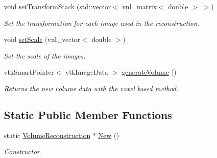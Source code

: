 \begin{DoxyCompactItemize}
void \hyperlink{class_volume_reconstruction_af64a1f92390e10bb4137fb4336b6c642}{set\-Transform\-Stack} (std\-::vector$<$ vnl\-\_\-matrix$<$ double $>$ $>$)
\begin{DoxyCompactList}\small\item\em Set the transformation for each image used in the reconstruction. \end{DoxyCompactList}\item 
void \hyperlink{class_volume_reconstruction_a0d8aadc257be0ebaf0830c2134c6af6e}{set\-Scale} (vnl\-\_\-vector$<$ double $>$)
\begin{DoxyCompactList}\small\item\em Set the scale of the images. \end{DoxyCompactList}\item 
vtk\-Smart\-Pointer$<$ vtk\-Image\-Data $>$ \hyperlink{class_volume_reconstruction_a30444231716f75031e8c57a2a8208f87}{generate\-Volume} ()
\begin{DoxyCompactList}\small\item\em Returns the new volume data with the voxel based method. \end{DoxyCompactList}\end{DoxyCompactItemize}
\subsection*{Static Public Member Functions}
\begin{DoxyCompactItemize}
\item 
static \hyperlink{class_volume_reconstruction}{Volume\-Reconstruction} $\ast$ \hyperlink{class_volume_reconstruction_a5c90b7fb1ef05a8ce122a9cb57976e0a}{New} ()
\begin{DoxyCompactList}\small\item\em Constructor. \end{DoxyCompactList}\end{DoxyCompactItemize}
